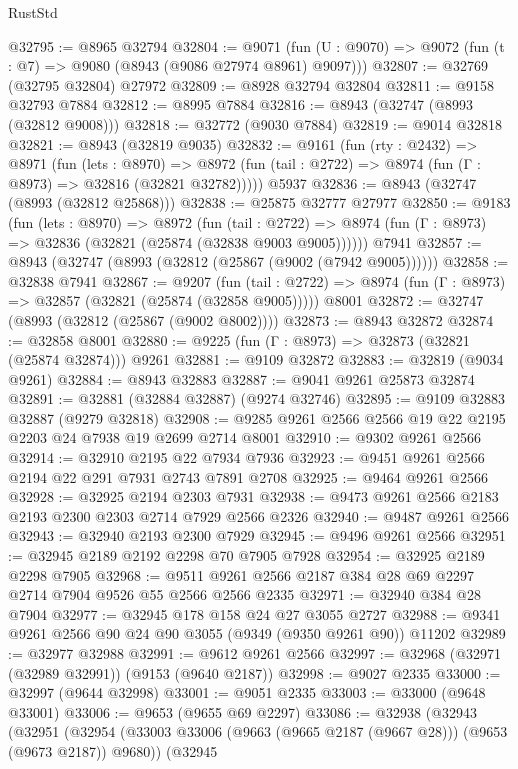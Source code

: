 \begin{lexlean}{RustStd}
\begin{coremodule}
{\begin{coremodule}
{{{{{{{{{{{{{{{{{{{{{{{{{{{{{{{{{{{{{{{@32795 := @8965 @32794
@32804 := @9071
    (fun (U : @9070) => @9072 (fun (t : @7) => @9080 (@8943 (@9086 @27974 @8961) @9097)))
@32807 := @32769 (@32795 @32804) @27972
@32809 := @8928 @32794 @32804
@32811 := @9158 @32793 @7884
@32812 := @8995 @7884
@32816 := @8943 (@32747 (@8993 (@32812 @9008)))
@32818 := @32772 (@9030 @7884)
@32819 := @9014 @32818
@32821 := @8943 (@32819 @9035)
@32832 := @9161
    (fun (rty : @2432) =>
    @8971
      (fun (lets : @8970) =>
      @8972 (fun (tail : @2722) => @8974 (fun (Γ : @8973) => @32816 (@32821 @32782)))))
    @5937
@32836 := @8943 (@32747 (@8993 (@32812 @25868)))
@32838 := @25875 @32777 @27977
@32850 := @9183
    (fun (lets : @8970) =>
    @8972
      (fun (tail : @2722) =>
      @8974 (fun (Γ : @8973) => @32836 (@32821 (@25874 (@32838 @9003 @9005))))))
    @7941
@32857 := @8943 (@32747 (@8993 (@32812 (@25867 (@9002 (@7942 @9005))))))
@32858 := @32838 @7941
@32867 := @9207
    (fun (tail : @2722) => @8974 (fun (Γ : @8973) => @32857 (@32821 (@25874 (@32858 @9005)))))
    @8001
@32872 := @32747 (@8993 (@32812 (@25867 (@9002 @8002))))
@32873 := @8943 @32872
@32874 := @32858 @8001
@32880 := @9225 (fun (Γ : @8973) => @32873 (@32821 (@25874 @32874))) @9261
@32881 := @9109 @32872
@32883 := @32819 (@9034 @9261)
@32884 := @8943 @32883
@32887 := @9041 @9261 @25873 @32874
@32891 := @32881 (@32884 @32887) (@9274 @32746)
@32895 := @9109 @32883 @32887 (@9279 @32818)
@32908 := @9285 @9261 @2566 @2566 @19 @22 @2195 @2203 @24 @7938 @19 @2699 @2714 @8001
@32910 := @9302 @9261 @2566
@32914 := @32910 @2195 @22 @7934 @7936
@32923 := @9451 @9261 @2566 @2194 @22 @291 @7931 @2743 @7891 @2708
@32925 := @9464 @9261 @2566
@32928 := @32925 @2194 @2303 @7931
@32938 := @9473 @9261 @2566 @2183 @2193 @2300 @2303 @2714 @7929 @2566 @2326
@32940 := @9487 @9261 @2566
@32943 := @32940 @2193 @2300 @7929
@32945 := @9496 @9261 @2566
@32951 := @32945 @2189 @2192 @2298 @70 @7905 @7928
@32954 := @32925 @2189 @2298 @7905
@32968 := @9511 @9261 @2566 @2187 @384 @28 @69 @2297 @2714 @7904 @9526 @55 @2566 @2566 @2335
@32971 := @32940 @384 @28 @7904
@32977 := @32945 @178 @158 @24 @27 @3055 @2727
@32988 := @9341 @9261 @2566 @90 @24 @90 @3055 (@9349 (@9350 @9261 @90)) @11202
@32989 := @32977 @32988
@32991 := @9612 @9261 @2566
@32997 := @32968 (@32971 (@32989 @32991)) (@9153 (@9640 @2187))
@32998 := @9027 @2335
@33000 := @32997 (@9644 @32998)
@33001 := @9051 @2335
@33003 := @33000 (@9648 @33001)
@33006 := @9653 (@9655 @69 @2297)
@33086 := @32938
    (@32943
      (@32951
        (@32954 (@33003 @33006 (@9663 (@9665 @2187 (@9667 @28))) (@9653 (@9673 @2187)) @9680))
        (@32945
}}}}}}}}}}}}}}}}}}}}}}}}}}}}}}}}}}}}}}}
\end{coremodule}}
\end{coremodule}
\end{lexlean}

